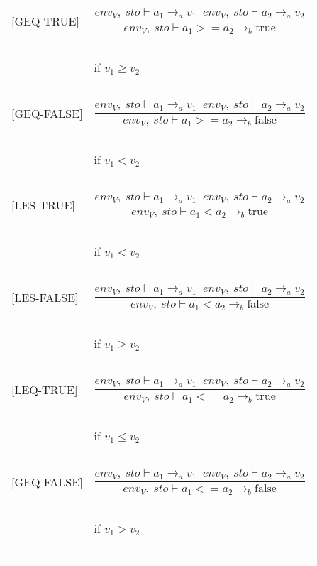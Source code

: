 \begin{longtable}{l l}
[GEQ-TRUE] & \[\frac{env_V, \: sto \vdash a_1 \rightarrow_a v_1 \;\; env_V, \: sto \vdash a_2 \rightarrow_a v_2}{env_V, \: sto \vdash a_1 >= a_2  \rightarrow_b \text{true}}\] \\
~ & ~ \\
~ & \indent\indent if $v_1 \geq v_2$ \\
~ & ~ \\

[GEQ-FALSE] & \[\frac{env_V, \: sto \vdash a_1 \rightarrow_a v_1 \;\; env_V, \: sto \vdash a_2 \rightarrow_a v_2}{env_V, \: sto \vdash a_1 >= a_2  \rightarrow_b \text{false}}\] \\
~ & ~ \\
~ & \indent\indent if $v_1 < v_2$ \\
~ & ~ \\

[LES-TRUE] & \[\frac{env_V, \: sto \vdash a_1 \rightarrow_a v_1 \;\; env_V, \: sto \vdash a_2 \rightarrow_a v_2}{env_V, \: sto \vdash a_1 < a_2  \rightarrow_b \text{true}}\] \\
~ & ~ \\
~ & \indent\indent if $v_1 < v_2$ \\
~ & ~ \\

[LES-FALSE] & \[\frac{env_V, \: sto \vdash a_1 \rightarrow_a v_1 \;\; env_V, \: sto \vdash a_2 \rightarrow_a v_2}{env_V, \: sto \vdash a_1 < a_2  \rightarrow_b \text{false}}\] \\
~ & ~ \\
~ & \indent\indent if $v_1 \geq v_2$ \\
~ & ~ \\

[LEQ-TRUE] & \[\frac{env_V, \: sto \vdash a_1 \rightarrow_a v_1 \;\; env_V, \: sto \vdash a_2 \rightarrow_a v_2}{env_V, \: sto \vdash a_1 <= a_2  \rightarrow_b \text{true}}\] \\
~ & ~ \\
~ & \indent\indent if $v_1 \leq v_2$ \\
~ & ~ \\

[GEQ-FALSE] & \[\frac{env_V, \: sto \vdash a_1 \rightarrow_a v_1 \;\; env_V, \: sto \vdash a_2 \rightarrow_a v_2}{env_V, \: sto \vdash a_1 <= a_2  \rightarrow_b \text{false}}\] \\
~ & ~ \\
~ & \indent\indent if $v_1 > v_2$ \\
~ & ~ \\


\end{longtable}
